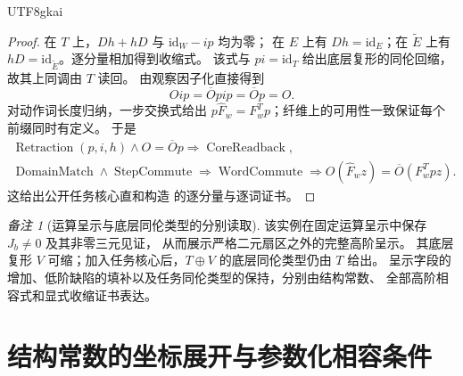\documentclass[12pt,a4paper,openany,notitlepage]{report}
\theoremstyle{plain}
\theoremstyle{definition}
\theoremstyle{remark}
\newtheorem{remark}[theorem]{备注}
\begin{document}
\begin{CJK*}{UTF8}{gkai}
\begin{proof}
在 $T$ 上，$Dh+hD$ 与 $\mathrm{id}_W-ip$ 均为零；
在 $E$ 上有 $Dh=\mathrm{id}_E$；在 $\widetilde E$ 上有
$hD=\mathrm{id}_{\widetilde E}$。逐分量相加得到收缩式。
该式与 $pi=\mathrm{id}_T$ 给出底层复形的同伦回缩，故其上同调由 $T$ 读回。
由观察因子化直接得到
\[
Oip=\overline O pip=\overline O p=O.
\]
对动作词长度归纳，一步交换式给出
$p\widehat F_w=F_w^Tp$；纤维上的可用性一致保证每个前缀同时有定义。
于是
\[
\begin{gathered}
\operatorname{Retraction}(p,i,h)\land O=\overline O p
\Rightarrow\operatorname{CoreReadback},\\
\operatorname{DomainMatch}\land\operatorname{StepCommute}
\Rightarrow\operatorname{WordCommute}
\Rightarrow O(\widehat F_w z)=\overline O(F_w^Tpz).
\end{gathered}
\]
这给出公开任务核心直和构造 \cite{S38} 的逐分量与逐词证书。
\end{proof}

\begin{remark}[运算呈示与底层同伦类型的分别读取]
\label{hgov:linfty:scope}
该实例在固定运算呈示中保存 $J_b\ne0$ 及其非零三元见证，
从而展示严格二元扇区之外的完整高阶呈示。
其底层复形 $V$ 可缩；加入任务核心后，$T\oplus V$ 的底层同伦类型仍由 $T$ 给出。
呈示字段的增加、低阶缺陷的填补以及任务同伦类型的保持，分别由结构常数、
全部高阶相容式和显式收缩证书表达。
\end{remark}

\section{结构常数的坐标展开与参数化相容条件}


\end{CJK*}
\end{document}
